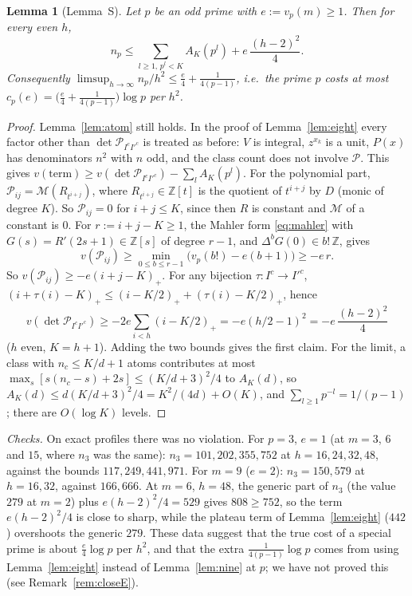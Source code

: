 \documentclass[11pt]{amsart}
\newtheorem{lemma}[theorem]{Lemma}
\theoremstyle{definition}
\theoremstyle{remark}
\numberwithin{equation}{section}
\newcommand{\ZZ}{\mathbb{Z}}
\newcommand{\cM}{\mathcal{M}}
\newcommand{\cP}{\mathcal{P}}
\begin{document}
\begin{lemma}[Lemma~S]\label{lem:S}
Let $p$ be an odd prime with $e:=v_p(m)\ge1$. Then for every even $h$,
\[
  n_p\le\sum_{l\ge1,\,p^l<K}A_K(p^l)+e\,\frac{(h-2)^2}4 .
\]
Consequently $\limsup_{h\to\infty}n_p/h^2\le\frac e4+\frac1{4(p-1)}$, i.e.\ the prime $p$ costs at most
$c_p(e)=\bigl(\frac e4+\frac1{4(p-1)}\bigr)\log p$ per $h^2$.
\end{lemma}

\begin{proof}
Lemma~\ref{lem:atom} still holds. In the proof of Lemma~\ref{lem:eight} every factor other than $\det\cP_{I^cI'^c}$ is
treated as before: $V$ is integral, $z^{x_k}$ is a unit, $P(x)$ has denominators $n^2$ with $n$ odd, and the class count
does not involve $\cP$. This gives $v(\text{term})\ge v(\det\cP_{I^cI'^c})-\sum_lA_K(p^l)$. For the polynomial part,
$\cP_{ij}=\cM(R_{t^{i+j}})$, where $R_{t^{i+j}}\in\ZZ[t]$ is the quotient of $t^{i+j}$ by $D$ (monic of degree $K$). So
$\cP_{ij}=0$ for $i+j\le K$, since then $R$ is constant and $\cM$ of a constant is $0$. For $r:=i+j-K\ge1$, the Mahler
form \eqref{eq:mahler} with $G(s)=R'(2s+1)\in\ZZ[s]$ of degree $r-1$, and $\Delta^bG(0)\in b!\,\ZZ$, gives
\[
  v(\cP_{ij})\ge\min_{0\le b\le r-1}\bigl(v_p(b!)-e(b+1)\bigr)\ge-e\,r .
\]
So $v(\cP_{ij})\ge-e(i+j-K)_+$. For any bijection $\tau\colon I^c\to I'^c$,
$(i+\tau(i)-K)_+\le(i-K/2)_++(\tau(i)-K/2)_+$, hence
\[
  v(\det\cP_{I^cI'^c})\ge-2e\sum_{i<h}(i-K/2)_+=-e(h/2-1)^2=-e\,\frac{(h-2)^2}4
\]
($h$ even, $K=h+1$). Adding the two bounds gives the first claim. For the limit, a class with $n_c\le K/d+1$ atoms
contributes at most $\max_s[s(n_c-s)+2s]\le(K/d+3)^2/4$ to $A_K(d)$, so $A_K(d)\le d(K/d+3)^2/4=K^2/(4d)+O(K)$, and
$\sum_{l\ge1}p^{-l}=1/(p-1)$; there are $O(\log K)$ levels.
\end{proof}

\emph{Checks.} On exact profiles there was no violation. For $p=3$, $e=1$ (at $m=3$, $6$ and $15$, where $n_3$ was the
same): $n_3=101,202,355,752$ at $h=16,24,32,48$, against the bounds $117,249,441,971$. For $m=9$ ($e=2$):
$n_3=150,579$ at $h=16,32$, against $166,666$. At $m=6$, $h=48$, the generic part of $n_3$ (the value $279$ at $m=2$)
plus $e(h-2)^2/4=529$ gives $808\ge752$, so the term $e(h-2)^2/4$ is close to sharp, while the plateau term of
Lemma~\ref{lem:eight} ($442$) overshoots the generic $279$. These data suggest that the true cost of a special prime is
about $\frac e4\log p$ per $h^2$, and that the extra $\frac1{4(p-1)}\log p$ comes from using Lemma~\ref{lem:eight}
instead of Lemma~\ref{lem:nine} at $p$; we have not proved this (see Remark~\ref{rem:closeE}).
\end{document}
